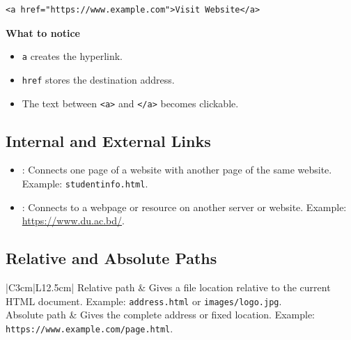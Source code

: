 \begin{lstlisting}[style=htmlide, caption={Basic Anchor Link}]
<a href="https://www.example.com">Visit Website</a>
\end{lstlisting}

\textbf{What to notice}
\begin{itemize}
    \item \texttt{a} creates the hyperlink.
    \item \texttt{href} stores the destination address.
    \item The text between \texttt{<a>} and \texttt{</a>} becomes clickable.
\end{itemize}

\subsection{Internal and External Links}
\begin{itemize}
    \item {}: Connects one page of a website with another page of the same website. Example: \texttt{studentinfo.html}.
    \item {}: Connects to a webpage or resource on another server or website. Example: {\hypersetup{urlcolor=black}\url{https://www.du.ac.bd/}}.
\end{itemize}

\subsection{Relative and Absolute Paths}
\begin{longtable}{|C{3cm}|L{12.5cm}|}
Relative path & Gives a file location relative to the current HTML document. Example: \texttt{address.html} or \texttt{images/logo.jpg}. \\ \tblhline
Absolute path & Gives the complete address or fixed location. Example: \texttt{https://www.example.com/page.html}. \\ \tblhline
\tblbottomrule
\caption{Types of paths used in hyperlinks}
\end{longtable}


